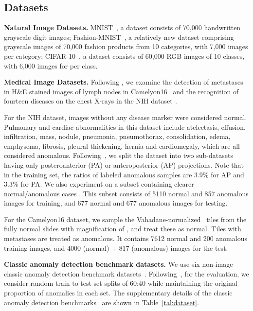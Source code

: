 \documentclass{bmvc2k}
\begin{document}
\subsection{Datasets}
\noindent\textbf{Natural Image Datasets.} MNIST~\cite{lecun1998mnist}, a dataset consists of 70,000  handwritten grayscale digit images; Fashion-MNIST~\cite{xiao2017fashion}, a relatively new dataset comprising  grayscale images of 70,000 fashion products from 10 categories, with 7,000 images per category; CIFAR-10~\cite{krizhevsky2009learning}, a dataset consists of 60,000  RGB images of 10 classes, with 6,000 images for per class.

\noindent\textbf{Medical Image Datasets.} Following \cite{tang2019deep,tuluptceva2020anomaly}, we examine the detection of metastases in H\&E stained images of lymph nodes in Camelyon16~\cite{bejnordi2017diagnostic} and the recognition of fourteen diseases on the chest X-rays in the NIH dataset~\cite{wang2017chestx}. 

For the NIH dataset, images without any disease marker were considered normal. Pulmonary and cardiac abnormalities in this dataset include atelectasis, effusion, infiltration, mass, nodule, pneumonia, pneumothorax, consolidation, edema, emphysema, fibrosis, pleural thickening, hernia and cardiomegaly, which are all considered anomalous. Following~\cite{tang2019deep,tuluptceva2020anomaly}, we split the dataset into two sub-datasets having only posteroanterior (PA) or anteroposterior (AP) projections. Note that in the training set, the ratios of labeled anomalous samples are 3.9\% for AP and 3.3\% for PA. We also experiment on a subset containing clearer normal/anomalous cases \cite{tang2019deep}. This subset consists of 5110 normal and 857 anomalous images for training, and 677 normal and 677 anomalous images for testing. 

For the Camelyon16 dataset, we sample the Vahadane-normalized~\cite{vahadane2016structure}  tiles from the fully normal slides with magnification of , and treat these as normal. Tiles with metastases are treated as anomalous. It contains 7612 normal and 200 anomalous training images, and 4000 (normal) + 817 (anomalous) images for the test.

\noindent\textbf{Classic anomaly detection benchmark datasets.} We use six non-image classic anomaly detection benchmark datasets~\cite{Rayana2016}. Following~\cite{SAD}, for the evaluation, we consider random train-to-test set splits of 60:40 while maintaining the original proportion of anomalies in each set. The supplementary details of the classic anomaly detection benchmarks~\cite{Rayana2016} are shown in Table~\ref{tal:dataset}.
\end{document}
